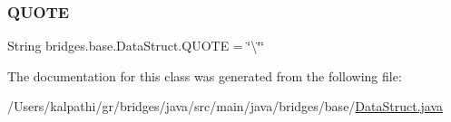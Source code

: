 \subsubsection{\texorpdfstring{QUOTE}{QUOTE}}
{\footnotesize\ttfamily String bridges.\+base.\+Data\+Struct.\+Q\+U\+O\+TE = \char`\"{}\textbackslash{}\char`\"{}\char`\"{}\hspace{0.3cm}{\ttfamily [protected]}}



The documentation for this class was generated from the following file\+:\begin{DoxyCompactItemize}
\item 
/\+Users/kalpathi/gr/bridges/java/src/main/java/bridges/base/\mbox{\hyperlink{_data_struct_8java}{Data\+Struct.\+java}}\end{DoxyCompactItemize}
